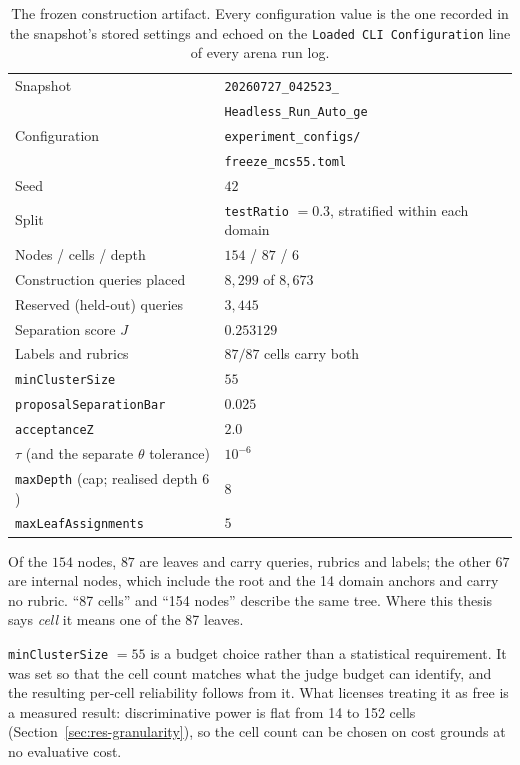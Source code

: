 \begin{table}[htbp]
    \centering
    \caption[The frozen construction artifact]{The frozen construction
    artifact. Every configuration value is the one recorded in the
    snapshot's stored settings and echoed on the
    \texttt{Loaded CLI Configuration} line of every arena run log.}
    \label{tab:frozen-artifact}
    \small
    \begin{tabular}{ll}
        \toprule
        Snapshot & \texttt{20260727\_042523\_}\\
                 & \texttt{Headless\_Run\_Auto\_ge} \\
        Configuration & \texttt{experiment\_configs/}\\
                      & \texttt{freeze\_mcs55.toml} \\
        Seed & $42$ \\
        Split & \texttt{testRatio} $=0.3$, stratified within each domain \\
        \addlinespace
        Nodes / cells / depth & $154$ / $87$ / $6$ \\
        Construction queries placed & $8{,}299$ of $8{,}673$ \\
        Reserved (held-out) queries & $3{,}445$ \\
        Separation score $J$ & $0.253129$ \\
        Labels and rubrics & $87/87$ cells carry both \\
        \addlinespace
        \texttt{minClusterSize} & $55$ \\
        \texttt{proposalSeparationBar} & $0.025$ \\
        \texttt{acceptanceZ} & $2.0$ \\
        $\tau$ (and the separate $\theta$ tolerance) & $10^{-6}$ \\
        \texttt{maxDepth} (cap; realised depth $6$) & $8$ \\
        \texttt{maxLeafAssignments} & $5$ \\
        \bottomrule
    \end{tabular}
\end{table}

Of the $154$ nodes, $87$ are leaves and carry queries, rubrics and
labels; the other $67$ are internal nodes, which include the root and
the 14 domain anchors and carry no rubric. ``87 cells'' and ``154
nodes'' describe the same tree. Where this thesis says \emph{cell} it
means one of the 87 leaves.

\texttt{minClusterSize} $=55$ is a budget choice rather than a
statistical requirement. It was set so that the cell count matches what
the judge budget can identify, and the resulting per-cell reliability
follows from it. What licenses treating it as free is a measured
result: discriminative power is flat from 14 to 152 cells
(Section~\ref{sec:res-granularity}), so the cell count can be chosen on
cost grounds at no evaluative cost.

